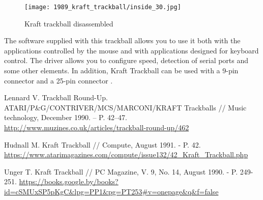 \documentclass[11pt, a4paper]{article}
\begin{document}
\begin{figure}[h]
    \centering
    \texttt{[image: 1989\_kraft\_trackball/inside\_30.jpg]}
    \caption{Kraft trackball disassembled}
    \label{fig:KraftInside}
\end{figure}

The software supplied with this trackball allows you to use it both with the applications controlled by the mouse and with applications designed for keyboard control. The driver allows you to configure speed, detection of serial ports and some other elements. In addition, Kraft Trackball can be used with a 9-pin connector and a 25-pin connector \cite{Hudnall}.

\begin{thebibliography}{9}
 Lennard V. Trackball Round-Up. ATARI/P\&G/CONTRIVER/MCS/MARCONI/KRAFT Trackballs // Music technology, December 1990. -- P. 42--47. \url{http://www.muzines.co.uk/articles/trackball-round-up/462}

 Hudnall M. Kraft Trackball // Compute, August 1991. - P. 42. \url{https://www.atarimagazines.com/compute/issue132/42_Kraft_Trackball.php}

 Unger T. Kraft Trackball // PC Magazine, V. 9, No. 14, August 1990. - P. 249-251. \url{https://books.google.by/books?id=cSMUxSP5pKgC&lpg=PP1&pg=PT253#v=onepage&q&f=false}
\end{thebibliography}
\end{document}
